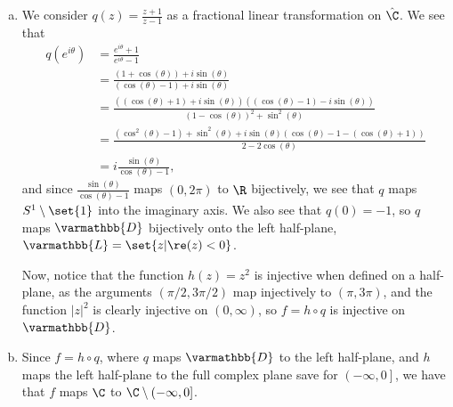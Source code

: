 \documentclass[10pt]{mypackage}
\renewcommand*{\mathbb}[1]{\varmathbb{#1}}
\begin{document}
\begin{solution}\hfill
  \begin{enumerate}[(a)]
    \item We consider $q(z) = \frac{z+1}{z-1}$ as a fractional linear transformation on $\hat{\C}$. We see that
      \begin{align*}
        q\left( e^{i\theta} \right) &= \frac{e^{i\theta} + 1}{e^{i\theta} - 1}\\
                                    &= \frac{\left( 1+\cos\left( \theta \right) \right) + i\sin\left( \theta \right)}{\left( \cos\left( \theta \right) - 1 \right) + i\sin\left( \theta \right)}\\
                                    &= \frac{\left( \left( \cos\left( \theta \right) +1 \right) + i\sin\left( \theta \right) \right)\left( \left( \cos\left( \theta \right)-1 \right) - i\sin\left( \theta \right)  \right)}{\left( 1-\cos\left( \theta \right) \right)^2 + \sin^2\left( \theta \right)}\\
                                    &= \frac{\left( \cos^2\left( \theta \right) - 1 \right) + \sin^2\left( \theta \right) + i\sin\left( \theta \right)\left( \cos\left( \theta \right) - 1 - \left( \cos\left( \theta \right) + 1 \right) \right)}{2-2\cos\left( \theta \right)}\\
                                    &= i\frac{\sin\left( \theta \right)}{\cos\left( \theta \right)-1},
      \end{align*}
      and since $\frac{\sin\left( \theta \right)}{\cos\left( \theta \right)-1}$ maps $(0,2\pi) $ to $ \R$ bijectively, we see that $q$ maps $S^{1}\setminus \set{1}$ into the imaginary axis. We also see that $q(0) = -1$, so $q$ maps $\mathbb{D}$ bijectively onto the left half-plane, $ \mathbb{L} = \set{z | \re(z) < 0} $.\newline

      Now, notice that the function $h(z) = z^2$ is injective when defined on a half-plane, as the arguments $\left( \pi/2,3\pi/2 \right)$ map injectively to $\left( \pi,3\pi \right)$, and the function $\left\vert z \right\vert^2$ is clearly injective on $(0,\infty)$, so $f = h\circ q$ is injective on $ \mathbb{D} $.
    \item Since $f = h\circ q$, where $q$ maps $ \mathbb{D} $ to the left half-plane, and $h$ maps the left half-plane to the full complex plane save for $\left( -\infty,0 \right]$, we have that $f$ maps $\C$ to $\C\setminus (-\infty,0]$.
  \end{enumerate}
\end{solution}
\end{document}
